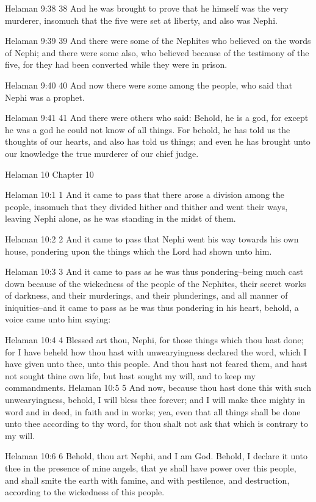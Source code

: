 Helaman 9:38
 38 And he was brought to prove that he himself was the very
murderer, insomuch that the five were set at liberty, and also
was Nephi.

Helaman 9:39
 39 And there were some of the Nephites who believed on the words
of Nephi; and there were some also, who believed because of the
testimony of the five, for they had been converted while they
were in prison.

Helaman 9:40
 40 And now there were some among the people, who said that Nephi
was a prophet.

Helaman 9:41
 41 And there were others who said: Behold, he is a god, for
except he was a god he could not know of all things. For behold,
he has told us the thoughts of our hearts, and also has told us
things; and even he has brought unto our knowledge the true
murderer of our chief judge.

Helaman 10
Chapter 10

Helaman 10:1
 1 And it came to pass that there arose a division among the
people, insomuch that they divided hither and thither and went
their ways, leaving Nephi alone, as he was standing in the midst
of them.

Helaman 10:2
 2 And it came to pass that Nephi went his way towards his own
house, pondering upon the things which the Lord had shown unto
him.

Helaman 10:3
 3 And it came to pass as he was thus pondering--being much cast
down because of the wickedness of the people of the Nephites,
their secret works of darkness, and their murderings, and their
plunderings, and all manner of iniquities--and it came to pass as
he was thus pondering in his heart, behold, a voice came unto him
saying:

Helaman 10:4
 4 Blessed art thou, Nephi, for those things which thou hast
done; for I have beheld how thou hast with unwearyingness
declared the word, which I have given unto thee, unto this
people. And thou hast not feared them, and hast not sought thine
own life, but hast sought my will, and to keep my commandments.
Helaman 10:5
 5 And now, because thou hast done this with such unwearyingness,
behold, I will bless thee forever; and I will make thee mighty in
word and in deed, in faith and in works; yea, even that all
things shall be done unto thee according to thy word, for thou
shalt not ask that which is contrary to my will.

Helaman 10:6
 6 Behold, thou art Nephi, and I am God. Behold, I declare it
unto thee in the presence of mine angels, that ye shall have
power over this people, and shall smite the earth with famine,
and with pestilence, and destruction, according to the wickedness
of this people.

